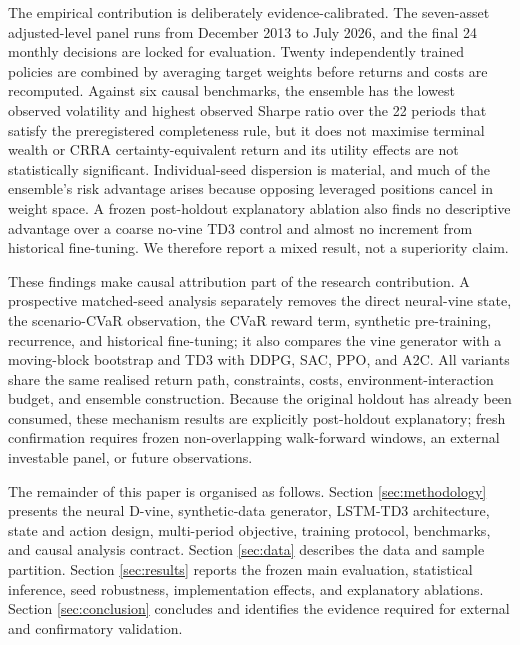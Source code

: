 The empirical contribution is deliberately evidence-calibrated. The seven-asset adjusted-level panel runs from December 2013 to July 2026, and the final 24 monthly decisions are locked for evaluation. Twenty independently trained policies are combined by averaging target weights before returns and costs are recomputed. Against six causal benchmarks, the ensemble has the lowest observed volatility and highest observed Sharpe ratio over the 22 periods that satisfy the preregistered completeness rule, but it does not maximise terminal wealth or CRRA certainty-equivalent return and its utility effects are not statistically significant. Individual-seed dispersion is material, and much of the ensemble's risk advantage arises because opposing leveraged positions cancel in weight space. A frozen post-holdout explanatory ablation also finds no descriptive advantage over a coarse no-vine TD3 control and almost no increment from historical fine-tuning. We therefore report a mixed result, not a superiority claim.

These findings make causal attribution part of the research contribution. A prospective matched-seed analysis separately removes the direct neural-vine state, the scenario-CVaR observation, the CVaR reward term, synthetic pre-training, recurrence, and historical fine-tuning; it also compares the vine generator with a moving-block bootstrap and TD3 with DDPG, SAC, PPO, and A2C. All variants share the same realised return path, constraints, costs, environment-interaction budget, and ensemble construction. Because the original holdout has already been consumed, these mechanism results are explicitly post-holdout explanatory; fresh confirmation requires frozen non-overlapping walk-forward windows, an external investable panel, or future observations.

The remainder of this paper is organised as follows. Section \ref{sec:methodology} presents the neural D-vine, synthetic-data generator, LSTM-TD3 architecture, state and action design, multi-period objective, training protocol, benchmarks, and causal analysis contract. Section \ref{sec:data} describes the data and sample partition. Section \ref{sec:results} reports the frozen main evaluation, statistical inference, seed robustness, implementation effects, and explanatory ablations. Section \ref{sec:conclusion} concludes and identifies the evidence required for external and confirmatory validation.
